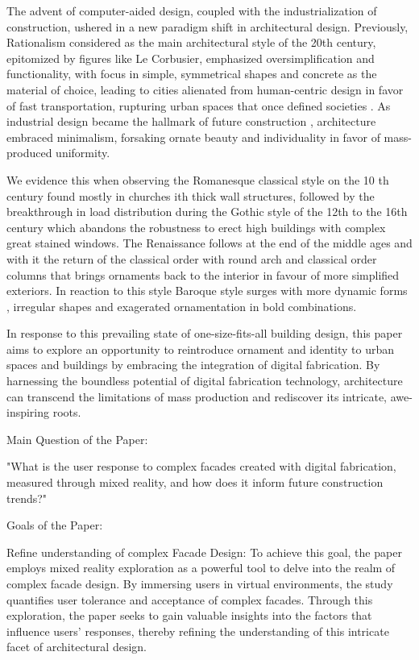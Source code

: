 The advent of computer-aided design, coupled with the industrialization of construction, ushered in a new paradigm shift in architectural design.
Previously, Rationalism considered as the main architectural style of the 20th century, epitomized by figures like Le Corbusier, emphasized oversimplification and functionality, with focus in simple, symmetrical shapes and concrete as the material of choice, leading to cities alienated from human-centric design in favor of fast transportation, rupturing urban spaces that once defined societies \cite{Stacbond2020}.
As industrial design became the hallmark of future construction \cite{Economakis2023}, architecture embraced minimalism, forsaking ornate beauty and individuality in favor of mass-produced uniformity.

We evidence this when observing the Romanesque classical style on the 10 th century found mostly in churches ith thick wall structures, followed by the breakthrough in load distribution during the Gothic style of the 12th to the 16th century which abandons the robustness to erect high buildings with complex great stained windows.
The Renaissance follows at the end of the middle ages and with it the return of the classical order with round arch and classical order columns that brings ornaments back to the interior in favour of more simplified exteriors. In reaction to this style Baroque style surges with more dynamic forms , irregular shapes and exagerated ornamentation in bold combinations.

In response to this prevailing state of one-size-fits-all building design, this paper aims to explore an opportunity to reintroduce ornament and identity to urban spaces and buildings by embracing the integration of digital fabrication. By harnessing the boundless potential of digital fabrication technology, architecture can transcend the limitations of mass production and rediscover its intricate, awe-inspiring roots.

Main Question of the Paper:

"What is the user response to complex facades created with digital fabrication, measured through mixed reality, and how does it inform future construction trends?"

Goals of the Paper:

Refine understanding of complex Facade Design: To achieve this goal, the paper employs mixed reality exploration as a powerful tool to delve into the realm of complex facade design. By immersing users in virtual environments, the study quantifies user tolerance and acceptance of complex facades. Through this exploration, the paper seeks to gain valuable insights into the factors that influence users' responses, thereby refining the understanding of this intricate facet of architectural design.

